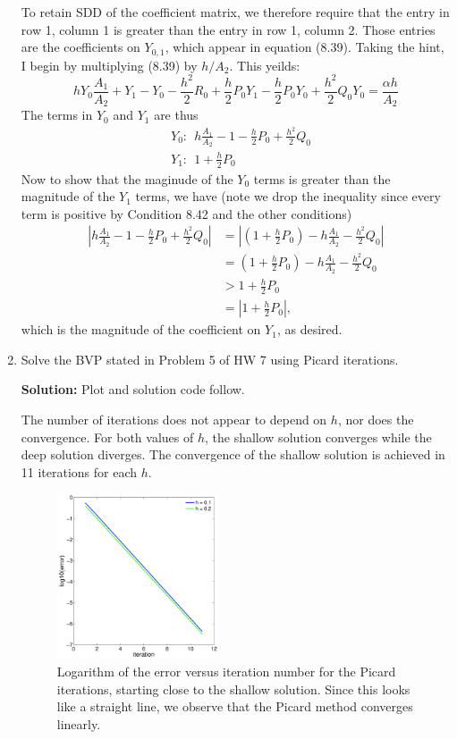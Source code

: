 \documentclass[11pt]{article}
\def\f{\frac }
\begin{document}
\begin{enumerate}
To retain SDD of the coefficient matrix, we therefore require that the entry in row 1, column 1 is greater than the entry in row 1, column 2.
Those entries are the coefficients on $Y_{0,1}$, which appear in equation (8.39).
Taking the hint, I begin by multiplying (8.39) by $h/A_2$.
This yeilds:
\[ hY_0 \f{A_1}{A_2} + Y_1 -Y_0 -\f{h^2}{2} R_0 +\f{h}{2} P_0 Y_1 - \f{h}{2} P_0 Y_0+ \f{h^2}{2} Q_0 Y_0 = \f{\alpha h}{A_2} \]
The terms in $Y_0$ and $Y_1$ are thus
\begin{align*} & Y_0: ~~ h\f{A_1}{A_2} - 1 - \f{h}{2} P_0 + \f{h^2}{2} Q_0\\
 & Y_1: ~~ 1+\f{h}{2} P_0 \end{align*}
Now to show that the maginude of the $Y_0$ terms is greater than the magnitude of the $Y_1$ terms, we have (note we drop the inequality since every term is positive by Condition 8.42 and the other conditions)
\begin{align*} \left | h\f{A_1}{A_2} - 1 - \f{h}{2} P_0 + \f{h^2}{2} Q_0 \right | & =\left | \left (1 +\f{h}{2} P_0 \right )- h\f{A_1}{A_2}   - \f{h^2}{2} Q_0 \right |\\
& = \left ( 1+\f{h}{2} P_0\right)   - h\f{A_1}{A_2}- \f{h^2}{2} Q_0\\
& >  1+\f{h}{2} P_0 \\
& = \left | 1+\f{h}{2} P_0 \right |,\end{align*}
which is the magnitude of the coefficient on $Y_1$, as desired.

\clearpage
\pagebreak
\item Solve the BVP stated in Problem 5 of HW 7 using Picard iterations.

\bigskip
\textbf{Solution:} Plot and solution code follow.

The number of iterations does not appear to depend on $h$, nor does the convergence.
For both values of $h$, the shallow solution converges while the deep solution diverges.
The convergence of the shallow solution is achieved in 11 iterations for each $h$.



\begin{figure}[h!]
  \centering
    \includegraphics[width=0.45\textwidth]{andy_hw08_prb08_shallowerror.pdf}
  \caption{Logarithm of the error versus iteration number for the Picard iterations, starting close to the shallow solution.
           Since this looks like a straight line, we observe that the Picard method converges linearly.}
\end{figure}


\end{enumerate}
\end{document}
